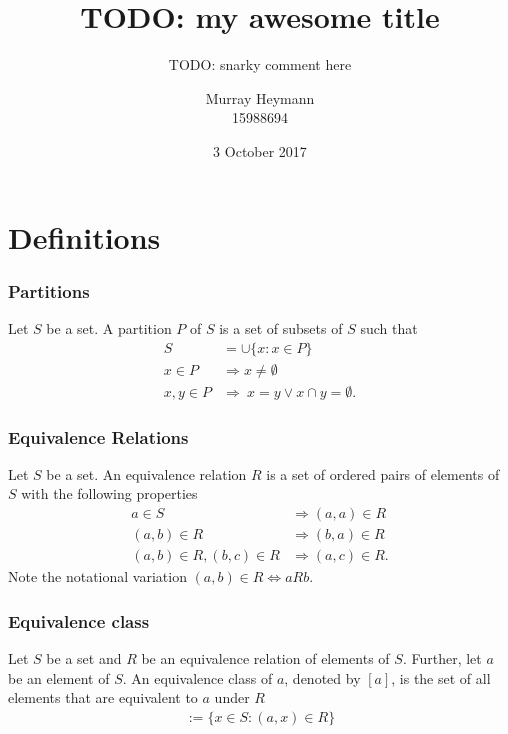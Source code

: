 \documentclass{beamer}
\title{TODO: my awesome title}
\subtitle{TODO: snarky comment here}
\author{Murray Heymann\\15988694}
\institute{University of Stellenbosch}
\date{3 October 2017}
\theoremstyle{definition}
\begin{document}
\begin{frame}
	\titlepage
\end{frame}

\section{Definitions}

\begin{frame}
	\frametitle{Partitions}
	\begin{definition}
		Let $S$ be a set.
		A partition $P$ of $S$ is a set of subsets of $S$ such that 
		\begin{align}
			S &= \cup\{x : x \in P\}\\
			x \in P &\Rightarrow x \not = \emptyset\\
			x, y \in P &\Rightarrow\ x = y \vee x \cap y = \emptyset.
		\end{align}
	\end{definition}
\end{frame}

\begin{frame}
	\frametitle{Equivalence Relations}
	\begin{definition}
		Let $S$ be a set.  An equivalence relation $R$ is a set of ordered
		pairs of elements of $S$ with the following properties
		\begin{align}
			a \in S &\Rightarrow (a, a) \in R\\
			(a, b) \in R &\Rightarrow (b, a) \in R\\
			\label{trans}(a, b) \in R, (b, c) \in R &\Rightarrow (a, c) \in R.
		\end{align}
		Note the notational variation $(a, b) \in R \Leftrightarrow aRb$.
	\end{definition}
\end{frame}

\begin{frame}
	\frametitle{Equivalence class}
	\begin{definition}
		Let $S$ be a set and $R$ be an equivalence relation of elements of
		$S$. Further, let $a$ be an element of $S$. An equivalence class of
		$a$, denoted by $[a]$, is the set of all elements that are equivalent
		to $a$ under $R$
		\begin{align}
			[a] := \{x \in S : (a, x) \in R\}
		\end{align}

	\end{definition}
\end{frame}
	
\end{document}
